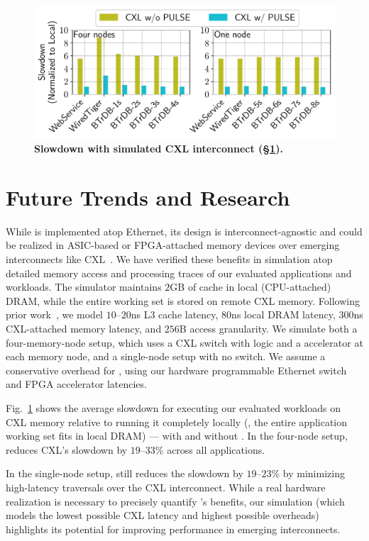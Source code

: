 \begin{figure}[t]
\centering
\includegraphics[width=0.9\columnwidth]{fig/pulse/cxl.pdf}
\vspace{-1em}
\caption{
\textbf{Slowdown with simulated CXL interconnect (\S\ref{sec:future}).} 
}

\label{fig:eval_cxl}
\end{figure}

\section{Future Trends and Research}
\label{sec:future}


While \name is implemented atop Ethernet, its design is interconnect-agnostic and could be realized in ASIC-based or FPGA-attached memory devices over emerging interconnects like CXL~\cite{cxl, cxl_azure, sun2023demystifying}. We have verified these benefits in simulation atop detailed memory access and processing traces of our evaluated applications and workloads. The simulator maintains $2$GB of cache in local (CPU-attached) DRAM, while the entire working set is stored on remote CXL memory. Following prior work~\cite{pond}, we model $10$--$20$ns L3 cache latency, $80$ns local DRAM latency, $300$ns CXL-attached memory latency, and $256$B access granularity. We simulate both a four-memory-node setup, which uses a CXL switch with \name logic and a \name accelerator at each memory node, and a single-node setup with no switch. We assume a conservative overhead for \name, using our hardware programmable Ethernet switch and FPGA accelerator latencies.
 
 
Fig.~\ref{fig:eval_cxl} shows the average slowdown for executing our evaluated workloads on CXL memory relative to running it completely locally (\ie, the entire application working set fits in local DRAM) --- with and without \name. In the four-node setup, \name reduces CXL's slowdown by $19$--$33$\% across all applications. 

In the single-node setup, \name still reduces the slowdown by $19$--$23$\% by minimizing high-latency traversals over the CXL interconnect. While a real hardware realization is necessary to precisely quantify \name's benefits, our simulation (which models the lowest possible CXL latency and highest possible \name overheads) highlights its potential for improving performance in emerging interconnects.

